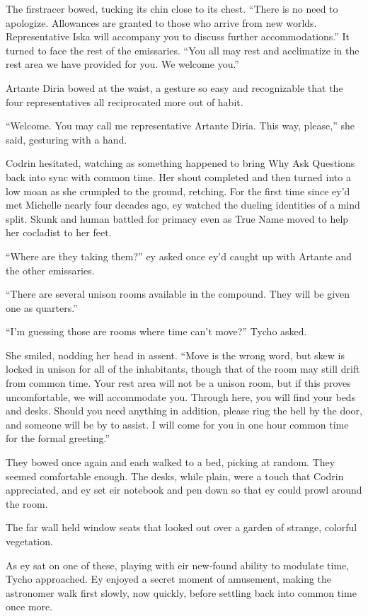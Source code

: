 The firstracer bowed, tucking its chin close to its chest. ``There is no need to apologize. Allowances are granted to those who arrive from new worlds. Representative Iska will accompany you to discuss further accommodations.'' It turned to face the rest of the emissaries. ``You all may rest and acclimatize in the rest area we have provided for you. We welcome you.''

Artante Diria bowed at the waist, a gesture so easy and recognizable that the four representatives all reciprocated more out of habit.

``Welcome. You may call me representative Artante Diria. This way, please,'' she said, gesturing with a hand.

Codrin hesitated, watching as something happened to bring Why Ask Questions back into sync with common time. Her shout completed and then turned into a low moan as she crumpled to the ground, retching. For the first time since ey'd met Michelle nearly four decades ago, ey watched the dueling identities of a mind split. Skunk and human battled for primacy even as True Name moved to help her cocladist to her feet.

``Where are they taking them?'' ey asked once ey'd caught up with Artante and the other emissaries.

``There are several unison rooms available in the compound. They will be given one as quarters.''

``I'm guessing those are rooms where time can't move?'' Tycho asked.

She smiled, nodding her head in assent. ``Move is the wrong word, but skew is locked in unison for all of the inhabitants, though that of the room may still drift from common time. Your rest area will not be a unison room, but if this proves uncomfortable, we will accommodate you. Through here, you will find your beds and desks. Should you need anything in addition, please ring the bell by the door, and someone will be by to assist. I will come for you in one hour common time for the formal greeting.''

They bowed once again and each walked to a bed, picking at random. They seemed comfortable enough. The desks, while plain, were a touch that Codrin appreciated, and ey set eir notebook and pen down so that ey could prowl around the room.

The far wall held window seats that looked out over a garden of strange, colorful vegetation.

As ey sat on one of these, playing with eir new-found ability to modulate time, Tycho approached. Ey enjoyed a secret moment of amusement, making the astronomer walk first slowly, now quickly, before settling back into common time once more.


